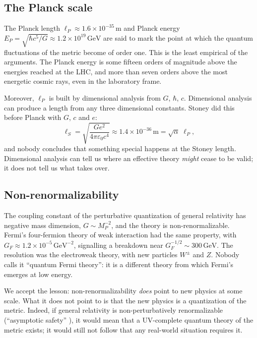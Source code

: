 \subsection{The Planck scale}

The Planck length $\ell_P\approx 1.6\times10^{-35}\,\mathrm{m}$ and Planck
energy $E_P=\sqrt{\hbar c^5/G}\approx 1.2\times10^{19}\,\mathrm{GeV}$ are
said to mark the point at which the quantum fluctuations of the metric
become of order one. This is the least empirical of the arguments. The
Planck energy is some fifteen orders of magnitude above the energies
reached at the LHC, and more than seven orders above the most
energetic cosmic rays, even in the laboratory frame.

Moreover, $\ell_P$ is built by dimensional analysis from $G$, $\hbar$,
$c$. Dimensional analysis can produce a length from any three dimensional
constants. Stoney did this before Planck with $G$, $c$ and $e$:
\begin{equation}
  \ell_S = \sqrt{\frac{G e^2}{4\pi\varepsilon_0 c^4}}
  \approx 1.4\times10^{-36}\,\mathrm{m}
  = \sqrt{\alpha}\;\ell_P ,
\end{equation}
and nobody concludes that something special happens at the Stoney length.
Dimensional analysis can tell us where an effective theory \emph{might}
cease to be valid; it does not tell us what takes over.

\subsection{Non-renormalizability}

The coupling constant of the perturbative quantization of general
relativity has negative mass dimension, $G\sim M_P^{-2}$, and the theory
is non-renormalizable. Fermi's four-fermion theory of weak interaction had
the same property, with $G_F\approx 1.2\times10^{-5}\,\mathrm{GeV}^{-2}$,
signalling a breakdown near $G_F^{-1/2}\sim 300\,\mathrm{GeV}$. The
resolution was the electroweak theory, with new particles $W^\pm$ and
$Z$. Nobody calls it ``quantum Fermi theory'': it is a different theory
from which Fermi's emerges at low energy.

We accept the lesson: non-renormalizability \emph{does} point to new
physics at some scale. What it does not point to is that the new physics is
a quantization of the metric. Indeed, if general relativity is
non-perturbatively renormalizable (``asymptotic safety''
\cite{qg:weinberg79}), it would mean that a UV-complete quantum theory of
the metric exists; it would still not follow that any real-world situation
requires it.

